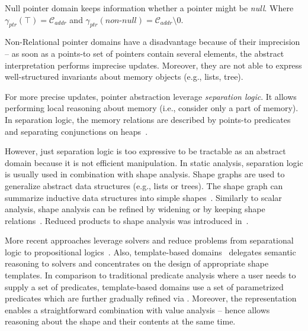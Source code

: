 \begin{marginfigure}

    \centering
    \caption{Null pointer domain keeps information whether a pointer might be \emph{null}. Where
    $\gamma_{\textit{ptr}}(\top) = \mathcal{C}_{\textit{addr}}$ and
    $\gamma_{\textit{ptr}}(\textit{non-null}) = \mathcal{C}_{\textit{addr}} \setminus 0$. }
    \label{fig:nulldomain}
\end{marginfigure}

Non-Relational pointer domains have a disadvantage because of their imprecision -- as soon as a points-to set of pointers contain several elements, the abstract interpretation performs imprecise updates. Moreover, they are not able to express well-structured invariants about memory objects (e.g., lists, tree).

For more precise updates, pointer abstraction leverage \emph{separation logic}. It allows performing local reasoning about memory (i.e., consider only a part of memory). In separation logic, the memory relations are described by points-to predicates and separating conjunctions on heaps~\cite{Reynolds2002}.

However, just separation logic is too expressive to be tractable as an abstract domain because it is not efficient manipulation. In static analysis, separation logic is usually used in combination with shape analysis. Shape graphs are used to generalize abstract data structures (e.g., lists or trees). The shape graph can summarize inductive data structures into simple shapes~\cite{Distefano2006}. Similarly to scalar analysis, shape analysis can be refined by widening or by keeping shape relations~\cite{Chang2008}.
Reduced products to shape analysis was introduced in~\cite{Toubhans2013}.

More recent approaches leverage \smt solvers and reduce problems from
separational logic to propositional logics~\cite{Piskac2013, Itzhaky2014,
Itzhaky2014b}.  Also, template-based domains~\cite{Malik2018} delegates
semantic reasoning to \smt solvers and concentrates on the design of
appropriate shape templates.  In comparison to traditional predicate analysis
where a user needs to supply a set of predicates, template-based domains use a
set of parametrized predicates which are further gradually refined via \smt.
Moreover, the \smt representation enables a straightforward combination with
value analysis -- hence allows reasoning about the shape and their contents at
the same time.

